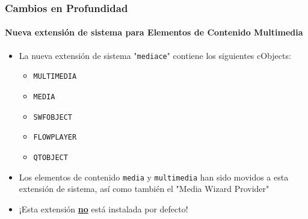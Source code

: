 \begin{frame}[fragile]
	\frametitle{Cambios en Profundidad}
	\framesubtitle{Nueva extensión de sistema para Elementos de Contenido Multimedia}

	\begin{itemize}

		\item La nueva extensión de sistema "\texttt{mediace}" contiene los siguientes cObjects:

			\begin{itemize}
				\item \texttt{MULTIMEDIA}
				\item \texttt{MEDIA}
				\item \texttt{SWFOBJECT}
				\item \texttt{FLOWPLAYER}
				\item \texttt{QTOBJECT}
			\end{itemize}

		\item Los elementos de contenido \texttt{media} y \texttt{multimedia} han sido movidos a esta
			extensión de sistema, así como también el "Media Wizard Provider"

		\item ¡Esta extensión \underline{\textbf{no}} está instalada por defecto!

	\end{itemize}

\end{frame}

